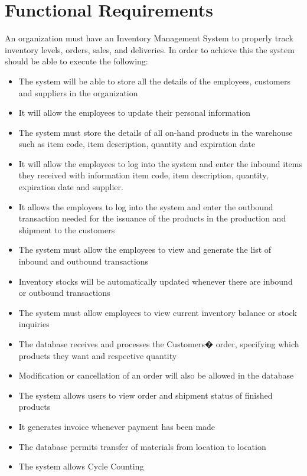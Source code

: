 \section{Functional Requirements}

An organization must have an Inventory Management System to properly track inventory levels, orders, sales, and deliveries. In order to achieve this the system should be able to execute the following:

\begin{itemize}
    \item The system will be able to store all the details of the employees, customers and suppliers in the organization
    \item It will allow the employees to update their personal information
    \item The system must store the details of all on-hand products in the warehouse such as item code, item description, quantity and expiration date
    \item It will allow the employees to log into the system and enter the inbound items they received with information item code, item description, quantity, expiration date and supplier. 
    \item It allows the employees to log into the system and enter the outbound transaction needed for the issuance of the products in the production and shipment to the customers
    \item The system must allow the employees to view and generate the list of inbound and outbound transactions
    \item Inventory stocks will be automatically updated whenever there are inbound or outbound transactions 
    \item The system must allow employees to view current inventory balance or stock inquiries
    \item The database receives and processes the Customers� order, specifying which products they want and respective quantity
    \item Modification or cancellation of an order will also be allowed in the database
    \item The system allows users to view order and shipment status of finished products
    \item It generates invoice whenever payment has been made
    \item The database permits transfer of materials from location to location
    \item The system allows Cycle Counting
\end{itemize}